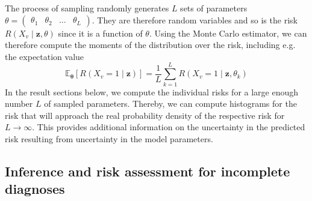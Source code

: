 \documentclass[../ms.tex]{subfiles}
\begin{document}
The process of sampling randomly generates $L$ sets of parameters $\theta = \begin{pmatrix} \theta_1 & \theta_2 & \ldots & \theta_L \end{pmatrix}$. They are therefore random variables and so is the risk $R \left( X_v \mid \mathbf{z}, \theta \right)$ since it is a function of $\theta$. Using the Monte Carlo estimator, we can therefore compute the moments of the distribution over the risk, including e.g. the expectation value
%
\begin{equation}
    \mathbb{E}_{\boldsymbol{\theta}} \left[ R \left( X_v = 1 \mid \mathbf{z} \right) \right] = \frac{1}{L} \sum_{k=1}^{L}{R \left( X_v = 1 \mid \mathbf{z}, \theta_k \right)}
\end{equation}
%
In the result sections below, we compute the individual risks for a large enough number $L$ of sampled parameters. Thereby, we can compute histograms for the risk that will approach the real probability density of the respective risk for $L \rightarrow \infty$. This provides additional information on the uncertainty in the predicted risk resulting from uncertainty in the model parameters.

\subsection{Inference and risk assessment for incomplete diagnoses}
\label{subsec:hmm_incomplete_diag}
\end{document}
